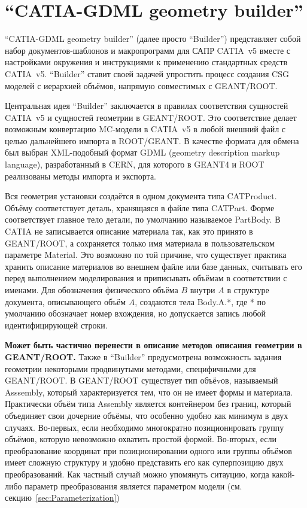 \section{``CATIA-GDML geometry builder''}\label{sec:Builder}

``CATIA-GDML geometry builder'' (далее просто ``Builder'') представляет собой набор документов-шаблонов и макропрограмм для САПР CATIA~v5 вместе с настройками окружения и инструкциями к применению стандартных средств CATIA~v5. ``Builder'' ставит своей задачей упростить процесс создания CSG моделей с иерархией объёмов, напрямую совместимых с GEANT/ROOT.

Центральная идея ``Builder'' заключается в правилах соответствия сущностей CATIA~v5 и сущностей геометрии в GEANT/ROOT. Это соответствие делает возможным конвертацию MC-модели в CATIA~v5 в любой внешний файл с целью дальнейшего импорта в ROOT/GEANT. В качестве формата для обмена был выбран XML-подобный формат GDML (geometry description markup language), разработанный в CERN, для которого в GEANT4 и ROOT реализованы методы импорта и экспорта.

Вся геометрия установки создаётся в одном документа типа CATProduct. Объёму соответствует деталь, хранящаяся в файле типа CATPart. Форме соответствует главное тело детали, по умолчанию называемое PartBody. В CATIA не записывается описание материала так, как это принято в GEANT/ROOT, а сохраняется только имя материала в пользовательском параметре Material. Это возможно по той причине, что существует практика хранить описание материалов во внешнем файле или базе данных, считывать его перед выполнением моделирования и приписывать объёмам в соответствии с именами. Для обозначения физического объёма $B$ внутри $A$ в структуре документа, описывающего объём $A$, создаются тела Body.A.*, где * по умолчанию обозначает номер вхождения, но допускается запись любой идентифицирующей строки.

\textbf{Может быть частично перенести в описание методов описания геометрии в GEANT/ROOT.}
Также в ``Builder'' предусмотрена возможность задания геометрии некоторыми продвинутыми методами, специфичными для GEANT/ROOT. В GEANT/ROOT существует тип объёvов, называемый Asssembly, который характеризуется тем, что он не имеет формы и материала. Практически объём типа Assembly является контейнером без границ, который объединяет свои дочерние объёмы, что особенно удобно как минимум в двух случаях. Во-первых, если необходимо многократно позиционировать группу объёмов, которую невозможно охватить простой формой. Во-вторых, если преобразование координат при позиционировании одного или группы объёмов имеет сложную структуру и удобно представить его как суперпозицию двух преобразований. Как частный случай можно упомянуть ситауцию, когда какой-либо параметр преобразования является параметром модели (см. секцию~\ref{sec:Parameterization})

